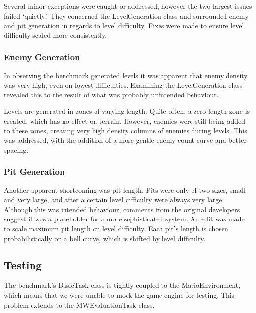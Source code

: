Several minor exceptions were caught or addressed, however the two largest issues failed `quietly'. They concerned the LevelGeneration class and surrounded enemy and pit generation in regards to level difficulty. Fixes were made to ensure level difficulty scaled more consistently.

\subsubsection{Enemy Generation}

In observing the benchmark generated levels it was apparent that enemy density was very high, even on lowest difficulties. Examining the LevelGeneration class revealed this to the result of what was probably unintended behaviour. 

Levels are generated in zones of varying length. Quite often, a zero length zone is created, which has no effect on terrain. However, enemies were still being added to these zones, creating very high density columns of enemies during levels. This was addressed, with the addition of a more gentle enemy count curve and better spacing.

\subsubsection{Pit Generation}

Another apparent shortcoming was pit length. Pits were only of two sizes, small and very large, and after a certain level difficulty were always very large. Although this was intended behaviour, comments from the original developers suggest it was a placeholder for a more sophisticated system. An edit was made to scale maximum pit length on level difficulty. Each pit's length is chosen probabilistically on a bell curve, which is shifted by level difficulty.



\subsection{Testing}
\label{subsec:lptest}

The benchmark's BasicTask class is tightly coupled to the MarioEnvironment, which means that we were unable to mock the game-engine for testing. This problem extends to the MWEvaluationTask class.

